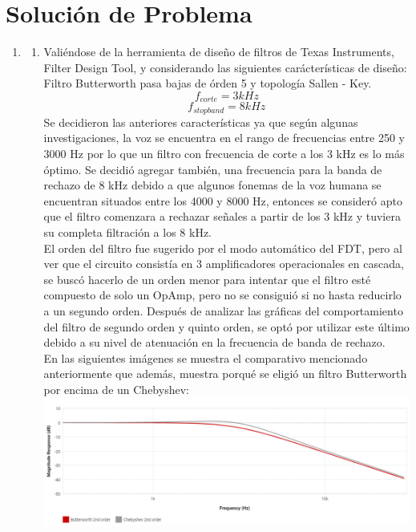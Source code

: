 \documentclass[12pt]{article}
\begin{document}
\section{Solución de Problema}
\begin{enumerate}
    \item 
    \begin{enumerate}
        \item Valiéndose de la herramienta de diseño de filtros de Texas Instruments, Filter Design Tool, y considerando las siguientes carácterísticas de diseño:
        \\
        Filtro Butterworth pasa bajas de órden 5 y topología Sallen - Key.
        $$f_{corte} = 3 kHz$$
        $$f_{stopband} = 8 kHz$$
        Se decidieron las anteriores características ya que según algunas investigaciones, la voz se encuentra en el rango de frecuencias entre 250 y 3000 Hz por lo que un filtro con frecuencia de corte a los 3 kHz es lo más óptimo. Se decidió agregar también, una frecuencia para la banda de rechazo de 8 kHz debido a que algunos fonemas de la voz humana se encuentran situados entre los 4000 y 8000 Hz, entonces se consideró apto que el filtro comenzara a rechazar señales a partir de los 3 kHz y tuviera su completa filtración a los 8 kHz. 
        \\
        El orden del filtro fue sugerido por el modo automático del FDT, pero al ver que el circuito consistía en 3 amplificadores operacionales en cascada, se buscó hacerlo de un orden menor para intentar que el filtro esté compuesto de solo un OpAmp, pero no se consiguió si no hasta reducirlo a un segundo orden. Después de analizar las gráficas del comportamiento del filtro de segundo orden y quinto orden, se optó por utilizar este último debido a su nivel de atenuación en la frecuencia de banda de rechazo.
        \\
        En las siguientes imágenes se muestra el comparativo mencionado anteriormente que además, muestra porqué se eligió un filtro Butterworth por encima de un Chebyshev:
        \\
        \includegraphics[scale=0.50]{But_vs_Cheb_2ord.png}

\end{enumerate}
\end{enumerate}
\end{document}
